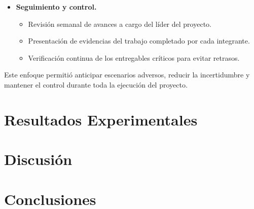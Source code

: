 \documentclass[12pt,letterpaper]{article}
\begin{document}
\begin{itemize}
    \item \textbf{Seguimiento y control.}
    \begin{itemize}
        \item Revisión semanal de avances a cargo del líder del proyecto.
        \item Presentación de evidencias del trabajo completado por cada
        integrante.
        \item Verificación continua de los entregables críticos para
        evitar retrasos.
    \end{itemize}
\end{itemize}

Este enfoque permitió anticipar escenarios adversos, reducir la
incertidumbre y mantener el control durante toda la ejecución del
proyecto.


\section{Resultados Experimentales}


\section{Discusión}


\section{Conclusiones}

\end{document}
